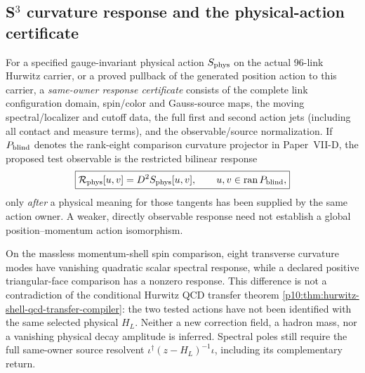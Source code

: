\documentclass[12pt,a4paper]{article}
\begin{document}
\subsection{S$^3$ curvature response and the physical-action certificate}
\label{p10:subsec:s3-response-owner-v1178}
\begin{definition}
\label{p10:def:s3-physical-response-certificate-v1178}
For a specified gauge-invariant physical action $S_{\rm phys}$ on the
actual 96-link Hurwitz carrier, or a proved pullback of the generated
position action to this carrier, a \emph{same-owner response certificate}
consists of the complete link configuration domain, spin/color and
Gauss-source maps, the moving spectral/localizer and cutoff data, the
full first and second action jets (including all contact and measure
terms), and the observable/source normalization.
If $P_{\rm blind}$ denotes the rank-eight comparison curvature projector
in Paper~VII-D, the proposed test observable is the restricted bilinear
response
\begin{equation}\label{p10:eq:s3-complete-response-v1178}
\boxed{\mathcal R_{\rm phys}[u,v]
 =D^2 S_{\rm phys}[u,v],\qquad
 u,v\in\operatorname{ran}P_{\rm blind},}
\end{equation}
only \emph{after} a physical meaning for those tangents has been
supplied by the same action owner.  A weaker, directly observable
response need not establish a global position--momentum action isomorphism.
\end{definition}

\begin{remark}
\label{p10:rem:s3-no-unowned-physical-modes-v1178}
On the massless momentum-shell spin comparison, eight transverse
curvature modes have vanishing quadratic scalar spectral response,
while a declared positive triangular-face comparison has a nonzero
response. This difference is not a contradiction of the conditional
Hurwitz QCD transfer theorem
\ref{p10:thm:hurwitz-shell-qcd-transfer-compiler}: the two tested actions
have not been identified with the same selected physical $H_L$.
Neither a new correction field, a hadron mass, nor a vanishing physical
decay amplitude is inferred.  Spectral poles still require the full
same-owner source resolvent
$\iota^\dagger(z-H_L)^{-1}\iota$, including its complementary return.
\end{remark}

\printbibliography
\end{document}
